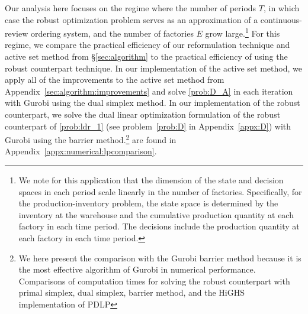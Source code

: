\documentclass[nonblindrev,mnsc]{informs3} %
\begin{document}
Our analysis here focuses on the regime where the number of periods $T$, in which case the robust optimization problem serves as an approximation of a continuous-review ordering system, and the number of factories $E$ grow large.\footnote{We note for this application that the dimension of the state and decision spaces in each period scale linearly in the number of  factories. Specifically, for the production-inventory problem, the state space is determined by the inventory at the warehouse and the cumulative production quantity at each factory in each time period. The decisions include the production quantity at each factory in each time period.}   For this regime, we compare the practical efficiency of our reformulation technique and active set method  from \S\ref{sec:algorithm}  to the practical efficiency of using the robust counterpart technique. In our implementation of the active set method, we apply all of the improvements to the active set method from Appendix~\ref{sec:algorithm:improvements} and solve \eqref{prob:D_A} in each iteration with Gurobi using the dual simplex method.  In our implementation of the robust counterpart, we solve the dual linear optimization formulation of the robust counterpart of \eqref{prob:ldr_1}  (see problem~\eqref{prob:D} in Appendix~\ref{appx:D}) with Gurobi  using the barrier method.\footnote{We here present the comparison with the Gurobi barrier method because it is the most effective algorithm of Gurobi in numerical performance. Comparisons of computation times for solving the robust counterpart with primal simplex, dual simplex,  barrier method, and the HiGHS implementation of PDLP} are found in Appendix~\ref{appx:numerical:lpcomparison}.  
\end{document}
